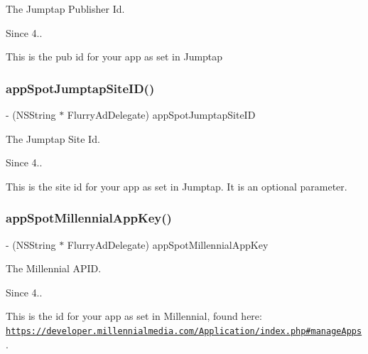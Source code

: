 The Jumptap Publisher Id. 

\begin{DoxySince}{Since}
4..
\end{DoxySince}
This is the pub id for your app as set in Jumptap \mbox{\label{protocolFlurryAdDelegate_01-p_a7099c0b2d18dac48c8a887efa0cfbca6}} 
\subsubsection{\texorpdfstring{app\+Spot\+Jumptap\+Site\+I\+D()}{appSpotJumptapSiteID()}}
{\footnotesize\ttfamily -\/ (N\+S\+String $\ast$ Flurry\+Ad\+Delegate) app\+Spot\+Jumptap\+Site\+ID \begin{DoxyParamCaption}{ }\end{DoxyParamCaption}}



The Jumptap Site Id. 

\begin{DoxySince}{Since}
4..
\end{DoxySince}
This is the site id for your app as set in Jumptap. It is an optional parameter. \mbox{\label{protocolFlurryAdDelegate_01-p_a01d0c47af3d321b8d0785fd76d68576d}} 
\subsubsection{\texorpdfstring{app\+Spot\+Millennial\+App\+Key()}{appSpotMillennialAppKey()}}
{\footnotesize\ttfamily -\/ (N\+S\+String $\ast$ Flurry\+Ad\+Delegate) app\+Spot\+Millennial\+App\+Key \begin{DoxyParamCaption}{ }\end{DoxyParamCaption}}



The Millennial A\+P\+ID. 

\begin{DoxySince}{Since}
4..
\end{DoxySince}
This is the id for your app as set in Millennial, found here\+: \href{https://developer.millennialmedia.com/Application/index.php#manageApps}{\tt https\+://developer.\+millennialmedia.\+com/\+Application/index.\+php\#manage\+Apps}. \mbox{\label{protocolFlurryAdDelegate_01-p_a366bfa8d8eca645ec976fe0debe94ae9}} 
